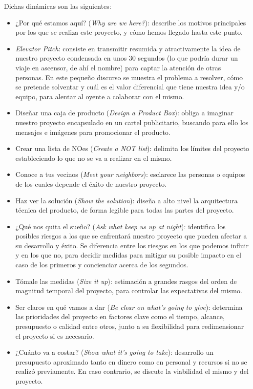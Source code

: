             Dichas dinámicas son las siguientes:
            \begin{itemize}
                \item ¿Por qué estamos aquí? (\textit{Why are we here?}): describe los motivos principales por los que se realiza este proyecto, y cómo hemos llegado hasta este punto.
                \item \textit{Elevator Pitch}: consiste en transmitir resumida y atractivamente la idea de nuestro proyecto condensada en unos 30 segundos (lo que podría durar un viaje en ascensor, de ahí el nombre) para captar la atención de otras personas. En este pequeño discurso se muestra el problema a resolver, cómo se pretende solventar y cuál es el valor diferencial que tiene nuestra idea y/o equipo, para alentar al oyente a colaborar con el mismo.
                \item Diseñar una caja de producto (\textit{Design a Product Box}): obliga a imaginar nuestro proyecto encapsulado en un cartel publicitario, buscando para ello los mensajes e imágenes para promocionar el producto.
                \item Crear una lista de NOes (\textit{Create a NOT list}): delimita los límites del proyecto estableciendo lo que no se va a realizar en el mismo.
                \item Conoce a tus vecinos (\textit{Meet your neighbors}): esclarece las personas o equipos de los cuales depende el éxito de nuestro proyecto.
                \item Haz ver la solución (\textit{Show the solution}): diseña a alto nivel la arquitectura técnica del producto, de forma legible para todas las partes del proyecto.
                \item ¿Qué nos quita el sueño? (\textit{Ask what keep us up at night}): identifica los posibles riesgos a los que se enfrentará nuestro proyecto que pueden afectar a su desarrollo y éxito. Se diferencia entre los riesgos en los que podemos influir y en los que no, para decidir medidas para mitigar su posible impacto en el caso de los primeros y concienciar acerca de los segundos.
                \item Tómale las medidas (\textit{Size it up}): estimación a grandes rasgos del orden de magnitud temporal del proyecto, para controlar las expectativas del mismo.
                \item Ser claros en qué vamos a dar (\textit{Be clear on what's going to give}): determina las prioridades del proyecto en factores clave como el tiempo, alcance, presupuesto o calidad entre otros, junto a su flexibilidad para redimensionar el proyecto si es necesario.
                \item ¿Cuánto va a costar? (\textit{Show what it's going to take}): desarrollo un presupuesto aproximado tanto en dinero como en personal y recursos si no se realizó previamente. En caso contrario, se discute la viabilidad el mismo y del proyecto.
                
            \end{itemize}
            
